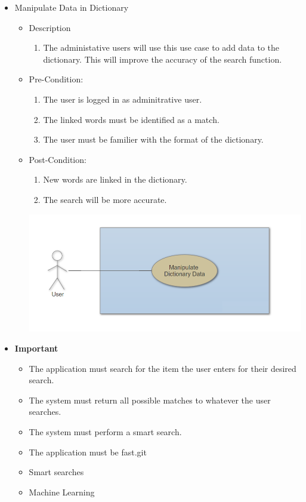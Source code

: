 \documentclass[a4paper,10pt]{article}
\begin{document}
\begin{enumerate}
\begin{itemize}
\begin{itemize}
				\end{itemize}
				\item Manipulate Data in Dictionary
				\begin{itemize}
					\item Description
						\begin{enumerate}
							\item The administative users will use this use case to add data to the dictionary. This will improve the accuracy of the search function.
						\end{enumerate}
					\item Pre-Condition:
						\begin{enumerate}	
							\item The user is logged in as adminitrative user.
							\item The linked words must be identified as a match.
							\item The user must be familier with the format of the dictionary.
						\end{enumerate}
					\item Post-Condition:
						\begin{enumerate}
							\item New words are linked in the dictionary.
							\item The search will be more accurate.
						\end{enumerate}
			 \includegraphics[scale=0.62]{Diagrams/ManipulateDictionaryUseCase.png}\\
			\end{itemize} 
		\item \textbf{Important} 
		\begin{itemize}
                \item The application must search for the item the user enters for their desired search. 
                \item The system must return all possible matches to whatever the user searches.
		\item The system must perform a smart search.
		\item The application must be fast.git 
		\item Smart searches
		\item Machine Learning
                \end{itemize}
		

\end{itemize}
\end{enumerate}
\end{document}
